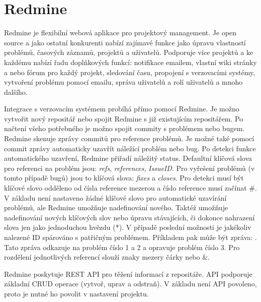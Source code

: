 \documentclass[czech,DP]{thesiskiv}
\begin{document}
\section{Redmine}
Redmine je flexibilní webová aplikace pro projektový management. Je open source a jako ostatní konkurenti nabízí zajímavé funkce jako úpravu vlastností problémů, časových záznamů, projektů a uživatelů. Podporuje více projektů a ke každému nabízí řadu doplňkových funkcí: notifikace emailem, vlastní wiki stránky a nebo fórum pro každý projekt, sledování času, propojení s verzovacími systémy, vytvoření problému pomocí emailu, správa uživatelů a rolí uživatelů a mnoho dalšího.

Integrace s verzovacím systémem probíhá přímo pomocí Redmine. Je možno vytvořit nový repositář nebo spojit Redmine s již existujícím repositářem. Po načtení všeho potřebného je možno spojit commity s problémem nebo bugem. Redmine skenuje zprávy commitů pro reference problémů. Je možné také pomocí commit zprávy automaticky uzavřít náležící problém nebo bug. Po detekci funkce automatického uzavření, Redmine přiřadí náležitý status. Defaultní klíčová slova pro referenci na problém jsou: \textit{refs}, \textit{references}, \textit{IssueID}. Pro vyřešení problémů (v tomto případě bugů) jsou to klíčová slova: \textit{fixes} a \textit{closes}. Pro detekci musí být klíčové slovo odděleno od čísla reference mezerou a číslo reference musí začínat \#. V základu není nastaveno žádné klíčové slovo pro automatické uzavírání problémů, ale Redmine umožňuje nadefinování nového. Taktéž umožňuje nadefinování nových klíčových slov nebo úpravu stávajících, či dokonce nahrazení slova jen jako jednoduchou hvězdu (*). V případě poslední možnosti je jakékoliv nalezené ID spárováno s patřičným problémem.
Příkladem pak může být zpráva: . Tato zpráva odkazuje na problém číslo 1 a 2 a opravuje problém číslo 3. Pro rozdělení jednotlivých referencí slouží znaky mezery čárky nebo \&.\cite{redminebugtracking}

Redmine poskytuje REST API pro těžení informací z repositáře. API podporuje základní CRUD operace (vytvoř, uprav a odstraň). V základu není API povoleno, proto je nutné ho povolit v nastavení projektu.

\end{document}
